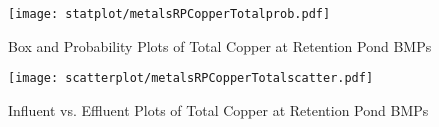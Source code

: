         \begin{figure}[hb]   %
            \centering
            \texttt{[image: statplot/metalsRPCopperTotalprob.pdf]}
            \caption{Box and Probability Plots of Total Copper at Retention Pond BMPs}
        \end{figure}         %
        
        
        \begin{figure}[hb]   %
            \centering
            \texttt{[image: scatterplot/metalsRPCopperTotalscatter.pdf]}
            \caption{Influent vs. Effluent Plots of Total Copper at Retention Pond BMPs}
        \end{figure}         %
        \clearpage
        